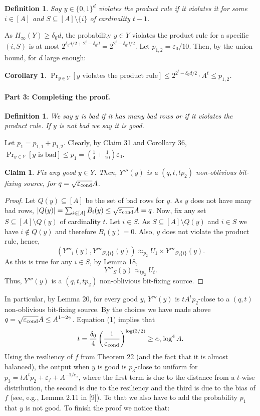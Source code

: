 \documentclass[10pt,a4paper]{article}
\newtheorem{definition}[theorem]{Definition}
\newtheorem{claim}[theorem]{Claim}
\newtheorem{corollary}[theorem]{Corollary}
\begin{document}
\begin{definition}
Say $y\in\{0,1\}^d$ violates the product rule if it violates it for some $i\in[A]$ and $S\subseteq[A]\setminus\{i\}$ of cardinality $t-1$.
\end{definition}
As $H_\infty(Y)\ge\delta_0d$, the probability $y\in Y$ violates the product rule for a specific $(i,S)$ is at most $2^{\delta_0d/2+2^t-\delta_0d}=2^{2^t-\delta_0d/2}$. Let $p_{1,2}=\varepsilon_0/10$. Then, by the union bound, for $d$ large enough:
\begin{corollary}$\Pr_{y\in Y}[y\text{ violates the product rule}]\le2^{2^t-\delta_0d/2}\cdot A^t\le p_{1,2}$.\end{corollary}
\paragraph{Part 3: Completing the proof.}
\begin{definition}
We say $y$ is bad if it has many bad rows or if it violates the product rule. If $y$ is not bad we say it is good.
\end{definition}
Let $p_1=p_{1,1}+p_{1,2}$. Clearly, by Claim 31 and Corollary 36, $\Pr_{y\in Y}[y\text{ is bad}]\le p_1=(\frac14+\frac1{10})\varepsilon_0$.
\begin{claim}
Fix any good $y\in Y$. Then, $Y'''(y)$ is a $(q,t,tp_2)$ non-oblivious bit-fixing source, for $q=\sqrt{\varepsilon_{\rm cond}}A$.
\end{claim}
\begin{proof}
Let $Q(y)\subseteq[A]$ be the set of bad rows for $y$. As $y$ does not have many bad rows, $|Q(y)|=\sum_{i\in[A]}B_i(y)\le\sqrt{\varepsilon_{\rm cond}}A=q$.
Now, fix any set $S\subseteq[A]\setminus Q(y)$ of cardinality $t$. Let $i\in S$. As $S\subseteq[A]\setminus Q(y)$ and $i\in S$ we have $i\notin Q(y)$ and therefore $B_i(y)=0$. Also, $y$ does not violate the product rule, hence,
\[(Y'''_i(y),Y'''_{S\setminus\{i\}}(y))\approx_{p_2}U_1\times Y'''_{S\setminus\{i\}}(y).\]
As this is true for any $i\in S$, by Lemma 18,
\[Y'''_S(y)\approx_{tp_2}U_t.\]
Thus, $Y'''(y)$ is a $(q,t,tp_2)$ non-oblivious bit-fixing source.
\end{proof}
In particular, by Lemma 20, for every good $y$, $Y'''(y)$ is $tA^tp_2$-close to a $(q,t)$ non-oblivious bit-fixing source. By the choices we have made above $q=\sqrt{\varepsilon_{\rm cond}}A\le A^{1-2\gamma}$. Equation (1) implies that
\[t=\frac{\delta_0}4\left(\frac1{\varepsilon_{\rm cond}}\right)^{\log(3/2)}\ge c_\gamma\log^4 A.\]
Using the resiliency of $f$ from Theorem 22 (and the fact that it is almost balanced), the output when $y$ is good is $p_3$-close to uniform for $p_3=tA^tp_2+\varepsilon_f+A^{-1/c_\gamma}$, where the first term is due to the distance from a $t$-wise distribution, the second is due to the resiliency and the third is due to the bias of $f$ (see, e.g., Lemma 2.11 in [9]). To that we also have to add the probability $p_1$ that $y$ is not good. To finish the proof we notice that:
\end{document}
